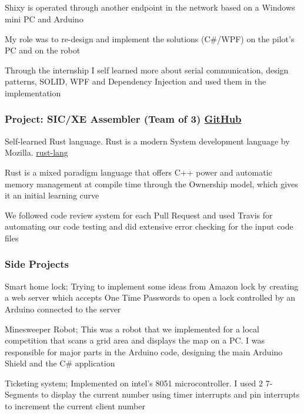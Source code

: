 \documentclass[paper=a4,fontsize=11pt]{scrartcl} %
\newcommand{\colorsubsec}[1]{\subsection{\color{AccentColor}{#1}}}
\begin{document}
\colorsubsec{Shixy [Advertisement Robot], TMentors, Cairo - Intern Software Engineer - October 2015 to August 2016}
\begin{itemize*}
	\item Shixy is operated through another endpoint in the network based on a Windows mini PC and Arduino
	\item My role was to re-design and implement the solutions (C\#/WPF) on the pilot's PC and on the robot
	\item Through the internship I self learned more about serial communication, design patterns, SOLID, WPF and Dependency Injection and used them in the implementation
\end{itemize*}
\subsubsection{Project: SIC/XE Assembler (Team of 3) \href{https://github.com/oddcoder/sickassembler}{GitHub}}
\begin{itemize*}
	\item Self-learned Rust language. Rust is a modern System development language by Mozilla. \href{https://www.rust-lang.org/}{rust-lang}
	\item Rust is a mixed paradigm language that offers C++ power and automatic memory management at compile time through the Ownership model, which gives it an initial  learning curve
	\item We followed code review system for each Pull Request and used Travis for automating our code testing and did extensive error checking for the input code files
\end{itemize*}

\subsubsection{Side Projects}
\begin{itemize*}
	\item Smart home lock; Trying to implement some ideas from Amazon lock by creating a web server which accepts One Time Passwords to open a lock controlled by an Arduino connected to the server
	\item Minesweeper Robot; This was a robot that we implemented for a local competition that scans a grid area and displays the map on a PC. I was responsible for major parts in the Arduino code, designing the main Arduino Shield and the C\# application
	\item Ticketing system; Implemented on intel's 8051 microcontroller. I used 2 7-Segments to display the current number using timer interrupts and pin interrupts to increment the current client number
\end{itemize*}
\end{document}
